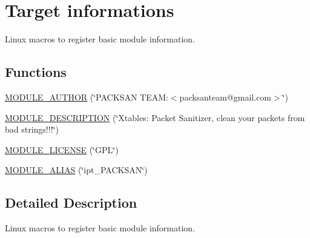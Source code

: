 \hypertarget{group__tg__info}{
\section{Target informations}
\label{group__tg__info}
}


Linux macros to register basic module information.  


\subsection*{Functions}
\begin{DoxyCompactItemize}
\item 
\hyperlink{group__tg__info_ga184bfbc3a7ee1f2642b68330b6ffe735}{MODULE\_\-AUTHOR} (\char`\"{}PACKSAN TEAM:$<$packsanteam@gmail.com$>$\char`\"{})
\item 
\hyperlink{group__tg__info_ga5fde41c9d3972b96f26d4873ba800887}{MODULE\_\-DESCRIPTION} (\char`\"{}Xtables: Packet Sanitizer, clean your packets from bad strings!!!\char`\"{})
\item 
\hyperlink{group__tg__info_gad94b36675e7eb067ea3ce6ff9e244a44}{MODULE\_\-LICENSE} (\char`\"{}GPL\char`\"{})
\item 
\hyperlink{group__tg__info_ga9a25cec7f2114963efbbea43c4d28ff6}{MODULE\_\-ALIAS} (\char`\"{}ipt\_\-PACKSAN\char`\"{})
\end{DoxyCompactItemize}


\subsection{Detailed Description}
Linux macros to register basic module information. 

